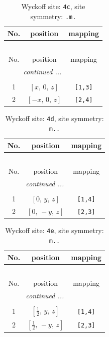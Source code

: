 \documentclass[fleqn,8pt]{jsarticle}
\begin{document}
\begin{longtable}{ccc}
\caption{Wyckoff site: {\tt 4c}, site symmetry: {\tt .m.}}
 \\
 \hline \hline
No. & position & mapping \\ \hline \endfirsthead

\multicolumn{2}{l}{\tablename\ \thetable{}} \\
 \hline \hline
No. & position & mapping \\ \hline \endhead

 \hline \hline
\multicolumn{2}{r}{\footnotesize\it continued ...} \\ \endfoot

 \hline \hline
\multicolumn{2}{r}{} \\ \endlastfoot

1 & $\left[ x,\, 0,\, z \right]$ & {\tt [1,3]} \\ \hline
2 & $\left[ - x,\, 0,\, z \right]$ & {\tt [2,4]} \\
\end{longtable}
\renewcommand{\arraystretch}{1.2}
\begin{longtable}{ccc}
\caption{Wyckoff site: {\tt 4d}, site symmetry: {\tt m..}}
 \\
 \hline \hline
No. & position & mapping \\ \hline \endfirsthead

\multicolumn{2}{l}{\tablename\ \thetable{}} \\
 \hline \hline
No. & position & mapping \\ \hline \endhead

 \hline \hline
\multicolumn{2}{r}{\footnotesize\it continued ...} \\ \endfoot

 \hline \hline
\multicolumn{2}{r}{} \\ \endlastfoot

1 & $\left[ 0,\, y,\, z \right]$ & {\tt [1,4]} \\ \hline
2 & $\left[ 0,\, - y,\, z \right]$ & {\tt [2,3]} \\
\end{longtable}
\renewcommand{\arraystretch}{1.2}
\begin{longtable}{ccc}
\caption{Wyckoff site: {\tt 4e}, site symmetry: {\tt m..}}
 \\
 \hline \hline
No. & position & mapping \\ \hline \endfirsthead

\multicolumn{2}{l}{\tablename\ \thetable{}} \\
 \hline \hline
No. & position & mapping \\ \hline \endhead

 \hline \hline
\multicolumn{2}{r}{\footnotesize\it continued ...} \\ \endfoot

 \hline \hline
\multicolumn{2}{r}{} \\ \endlastfoot

1 & $\left[ \frac{1}{2},\, y,\, z \right]$ & {\tt [1,4]} \\ \hline
2 & $\left[ \frac{1}{2},\, - y,\, z \right]$ & {\tt [2,3]} \\
\end{longtable}
\end{document}
